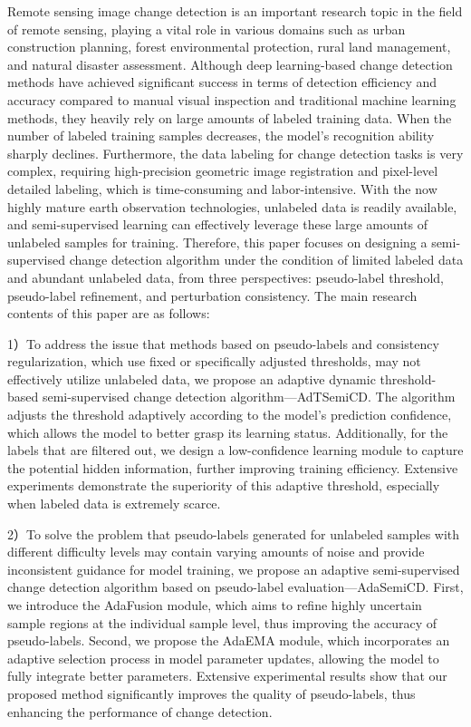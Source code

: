 \documentclass[lang=chs, degree=master, blindreview=false, adobe=false]{yanputhesis}
\begin{document}
\begin{engabstract}                                         %
    \noindent                               %
    Remote sensing image change detection is an important research topic in the field of remote sensing, playing a vital role in various domains such as urban construction planning, forest environmental protection, rural land management, and natural disaster assessment. Although deep learning-based change detection methods have achieved significant success in terms of detection efficiency and accuracy compared to manual visual inspection and traditional machine learning methods, they heavily rely on large amounts of labeled training data. When the number of labeled training samples decreases, the model's recognition ability sharply declines. Furthermore, the data labeling for change detection tasks is very complex, requiring high-precision geometric image registration and pixel-level detailed labeling, which is time-consuming and labor-intensive. With the now highly mature earth observation technologies, unlabeled data is readily available, and semi-supervised learning can effectively leverage these large amounts of unlabeled samples for training. Therefore, this paper focuses on designing a semi-supervised change detection algorithm under the condition of limited labeled data and abundant unlabeled data, from three perspectives: pseudo-label threshold, pseudo-label refinement, and perturbation consistency. The main research contents of this paper are as follows:

  1）To address the issue that methods based on pseudo-labels and consistency regularization, which use fixed or specifically adjusted thresholds, may not effectively utilize unlabeled data, we propose an adaptive dynamic threshold-based semi-supervised change detection algorithm—AdTSemiCD. The algorithm adjusts the threshold adaptively according to the model's prediction confidence, which allows the model to better grasp its learning status. Additionally, for the labels that are filtered out, we design a low-confidence learning module to capture the potential hidden information, further improving training efficiency. Extensive experiments demonstrate the superiority of this adaptive threshold, especially when labeled data is extremely scarce.

  2）To solve the problem that pseudo-labels generated for unlabeled samples with different difficulty levels may contain varying amounts of noise and provide inconsistent guidance for model training, we propose an adaptive semi-supervised change detection algorithm based on pseudo-label evaluation—AdaSemiCD. First, we introduce the AdaFusion module, which aims to refine highly uncertain sample regions at the individual sample level, thus improving the accuracy of pseudo-labels. Second, we propose the AdaEMA module, which incorporates an adaptive selection process in model parameter updates, allowing the model to fully integrate better parameters. Extensive experimental results show that our proposed method significantly improves the quality of pseudo-labels, thus enhancing the performance of change detection.


\end{engabstract}
\end{document}

